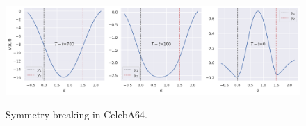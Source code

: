 \begin{figure}[ht!]
\centering
\begin{minipage}[b]{.368\textwidth}
\end{minipage}%
\begin{minipage}[b]{.625\textwidth}
\centering
{} %
\subfloat
  {\includegraphics[width=\textwidth]{figs/plots/potentials_celeba64_avg_20.png}}\vfill
\addtocounter{subfigure}{-2}
\end{minipage}
\caption{Symmetry breaking in CelebA64.}
\vspace{-0.1cm}
\label{fig:potentials_celeba64}
\end{figure}

